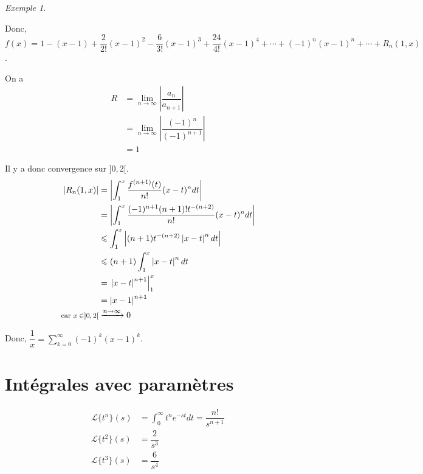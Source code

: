 \documentclass{report}
\newcommand*{\dsum}[4]{\displaystyle\sum_{#1=#2}^{#3}#4}
\newcommand*{\dlim}[3]{\displaystyle\lim_{#1 \to #2}#3}
\newcommand*{\dint}[3]{\displaystyle\int_{#1}^{#2}#3}
\newcommand*{\abs}[1]{\left| #1 \right|}
\newcommand*{\lte}{\leqslant}
\theoremstyle{definition}
\theoremstyle{remark}
\newtheorem*{exem}{Exemple}
\begin{document}
\begin{exem}
\begin{enumerate}[label=\alph*)]
			Donc, $f(x) = 1 - (x-1) + \dfrac{2}{2!}(x-1)^2 - \dfrac{6}{3!}(x-1)^3 + \dfrac{24}{4!}(x-1)^4 + \dotsb + (-1)^n(x-1)^n + \dotsb + R_n(1, x)$.

			On a
			\begin{align*}
				R&= \dlim{n}{\infty}{\abs{\dfrac{a_n}{a_{n+1}}}}\\
				&= \dlim{n}{\infty}{\abs{\dfrac{(-1)^n}{(-1)^{n+1}}}}\\
				&= 1
			\end{align*}

			Il y a donc convergence sur $]0,2[$.
			\begin{align*}
				\abs{R_n(1, x)}&= \abs{\dint{1}{x}{\dfrac{f^{(n+1)}(t)}{n!}(x-t)^n dt}}\\
				&= \abs{\dint{1}{x}{\dfrac{(-1)^{n+1}(n+1)!t^{-(n+2)}}{n!}(x-t)^n dt}}\\
				&\lte \dint{1}{x}{\abs{(n+1)t^{-(n+2)}\abs{x-t}^n dt}}\\
				&\lte (n+1) \dint{1}{x}{\abs{x-t}^n dt}\\
				&= \left. \abs{x-t}^{n+1} \right|_1^x\\
				&= \abs{x-1}^{n+1}\\
				\text{\footnotesize car $x \in ]0,2[$}&\xrightarrow{n \to \infty} 0
			\end{align*}

			Donc, $\dfrac{1}{x} = \dsum{k}{0}{\infty}{(-1)^k(x-1)^k}$.
		\end{enumerate}
	\end{exem}

	\chapter{Int\'egrales avec param\`etres}
	\begin{align*}
		\mathscr{L}\{t^n\}(s)&= \dint{0}{\infty}{t^ne^{-st} dt} = \dfrac{n!}{s^{n+1}}\\
		\mathscr{L}\{t^2\}(s)&= \dfrac{2}{s^3}\\
		\mathscr{L}\{t^3\}(s)&= \dfrac{6}{s^4}
	\end{align*}
\end{document}
